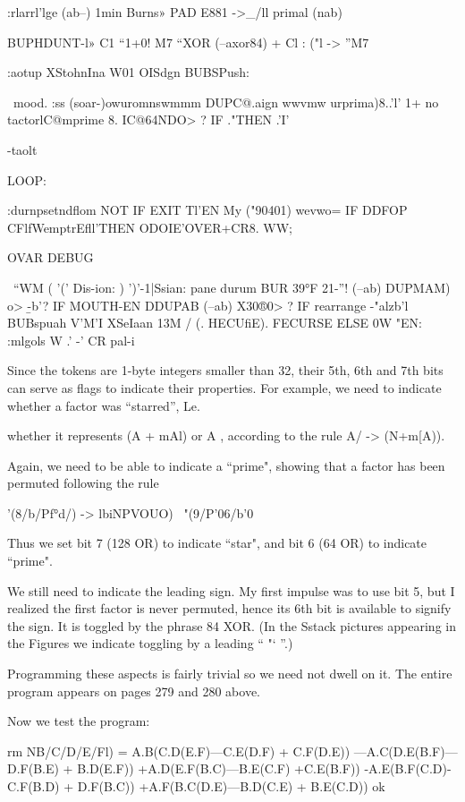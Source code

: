 :rlarrl'lge (ab--)
1min \hltM
Burns» PAD E881 \IMS->_/ll
primal (nab)

BUPHDUNT-l» C1 “1+0! \Mo M7
“XOR (--axor84) + Cl : ("l \M-> ”M7

:aotup XStohnIna
W01
OISdgn
BUBSPush:

\ mood.
:ss (soar-)owuromnswmmm
DUPC@.aign wwvmw urprima)8..'l'
1+ no tactor{lC@mprime} 8.
IC@64NDO> \ptimad?
IF ."THEN .'I'

\bnnm
\inits-taolt
\initdenha
\mpumlmsmssudt

LOOP:

:durnpsetndﬂom NOT IF EXIT Tl'EN
My ("90401)
wevwo= \sutnekunpm
IF DDFOP CFlfWemptrEﬂl’THEN
ODOIE'OVER+CR8. WW;

OVAR DEBUG

\ “WM
( '(' Dis-ion:
) ')'-1|Ssian:
pane durum
BUR 39°F 21-”! (--ab)
DUPMAM) o> \b-b'?
IF MOUTH-EN
DDUPAB (--ab) \etnput
X30®0> \mora?
IF rearrange \M-"alzb'l
BUBspuah V'M'I
XSeIaan 13M \a/
(. HECUﬁE).
FECURSE
ELSE 0W "EN:
:mlgols \Inpuls
W
.' -' CR \hrbaalay
pal-i

Since the tokens are 1-byte integers smaller than 32, their 5th, 6th
and 7th bits can serve as flags to indicate their properties. For
example, we need to indicate whether a factor was “starred”, Le.

whether it represents (A + mAl) or A , according to the rule
\‘A/ -> (N+m[A)).

Again, we need to be able to indicate a “prime", showing that a
factor has been permuted following the rule

\TI’(8/b/Pf°d/) -> lbiNPVOUO) ~"(9/P'06/b'0

Thus we set bit 7 (128 OR) to indicate “star", and bit 6 (64 OR)
to indicate “prime".

We still need to indicate the leading sign. My ﬁrst impulse was to
use bit 5, but I realized the ﬁrst factor is never permuted, hence
its 6th bit is available to signify the sign. It is toggled by the phrase
84 XOR. (In the Sstack pictures appearing in the Figures we
indicate toggling by a leading “ "‘ ”.)

Programming these aspects is fairly trivial so we need not dwell
on it. The entire program appears on pages 279 and 280 above.

Now we test the program:

rm NB/C/D/E/Fl) =
A.B(C.D(E.F)—C.E(D.F) + C.F(D.E))
—A.C(D.E(B.F)—D.F(B.E) + B.D(E.F))
+A.D(E.F(B.C)—B.E(C.F) +C.E(B.F))
-A.E(B.F(C.D)-C.F(B.D) + D.F(B.C))
+A.F(B.C(D.E)—B.D(C.E) + B.E(C.D)) ok

